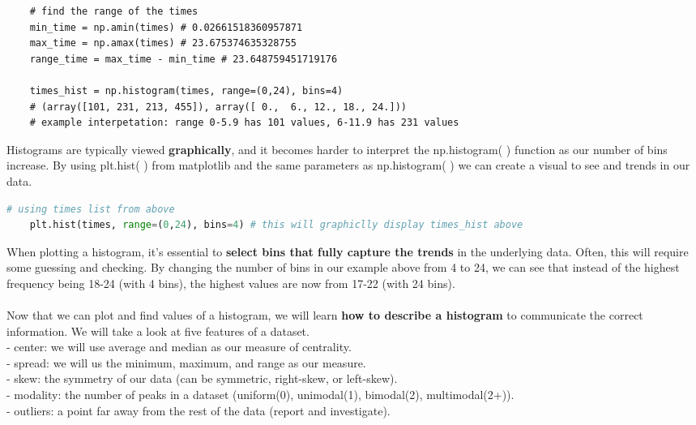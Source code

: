 \documentclass[11pt, a4paper]{article}
\begin{document}
\begin{spacing}{1.1}
\begin{lstlisting}
	# find the range of the times 
	min_time = np.amin(times) # 0.02661518360957871
	max_time = np.amax(times) # 23.675374635328755
	range_time = max_time - min_time # 23.648759451719176
	
	times_hist = np.histogram(times, range=(0,24), bins=4)
	# (array([101, 231, 213, 455]), array([ 0.,  6., 12., 18., 24.])) 
	# example interpetation: range 0-5.9 has 101 values, 6-11.9 has 231 values \end{lstlisting} \newpage

	\noindent Histograms are typically viewed \textbf{graphically}, and it becomes harder to interpret the np.histogram( ) function as our number of bins increase. By using plt.hist( ) from matplotlib and the same parameters as np.histogram( ) we can create a visual to see and trends in our data. 
	\begin{lstlisting}[language=Python]
	# using times list from above
	plt.hist(times, range=(0,24), bins=4) # this will graphiclly display times_hist above\end{lstlisting}\vspace*{1mm}
	When plotting a histogram, it’s essential to \textbf{select bins that fully capture the trends} in the underlying data. Often, this will require some guessing and checking. By changing the number of bins in our example above from 4 to 24, we can see that instead of the highest frequency being 18-24 (with 4 bins), the highest values are now from 17-22 (with 24 bins). \\~\\
	Now that we can plot and find values of a histogram, we will learn \textbf{how to describe a histogram} to communicate the correct information. We will take a look at five features of a dataset. \\
	\hspace*{3mm} - center: we will use average and median as our measure of centrality. \\
	\hspace*{3mm} - spread: we will us the minimum, maximum, and range as our measure. \\
	\hspace*{3mm} - skew: the symmetry of our data (can be symmetric, right-skew, or left-skew). \\
	\hspace*{3mm} - modality: the number of peaks in a dataset (uniform(0), unimodal(1), bimodal(2), multimodal(2+)). \\
	\hspace*{3mm} - outliers: a point far away from the rest of the data (report and investigate). \vspace*{1mm} \\

\end{spacing}
\end{document}
